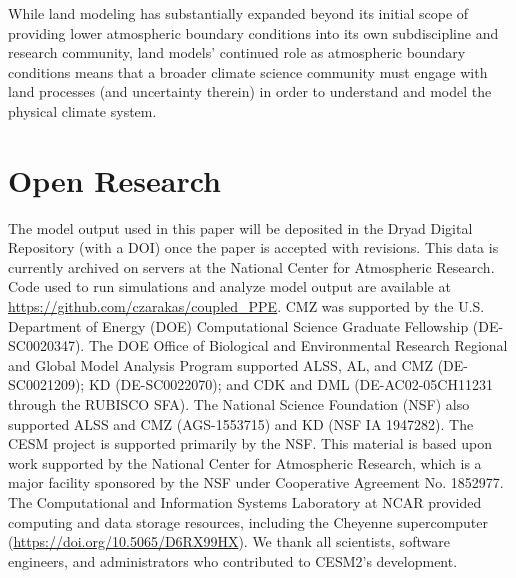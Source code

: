 \documentclass[draft]{agujournal2019}
\begin{document}
While land modeling has substantially expanded beyond its initial scope of providing lower atmospheric boundary conditions into its own subdiscipline and research community, land models’ continued role as atmospheric boundary conditions means that a broader climate science community must engage with land processes (and uncertainty therein) in order to understand and model the physical climate system.
\section{Open Research}
The model output used in this paper will be deposited in the Dryad Digital Repository (with a DOI) once the paper is accepted with revisions. This data is currently archived on servers at the National Center for Atmospheric Research. Code used to run simulations and analyze model output are available at \url{https://github.com/czarakas/coupled_PPE}.
\acknowledgments
CMZ was supported by the U.S. Department of Energy (DOE) Computational Science Graduate Fellowship (DE-SC0020347). The DOE Office of Biological and Environmental Research Regional and Global Model Analysis Program supported ALSS, AL, and CMZ (DE-SC0021209); KD (DE-SC0022070); and CDK and DML (DE-AC02-05CH11231 through the RUBISCO SFA). The National Science Foundation (NSF) also supported ALSS and CMZ (AGS-1553715) and KD (NSF IA 1947282). The CESM project is supported primarily by the NSF. This material is based upon work supported by the National Center for Atmospheric Research, which is a major facility sponsored by the NSF under Cooperative Agreement No. 1852977. The Computational and Information Systems Laboratory at NCAR provided computing and data storage resources, including the Cheyenne supercomputer (\url{https://doi.org/10.5065/D6RX99HX}). We thank all scientists, software engineers, and administrators who contributed to CESM2's development.

\end{document}
